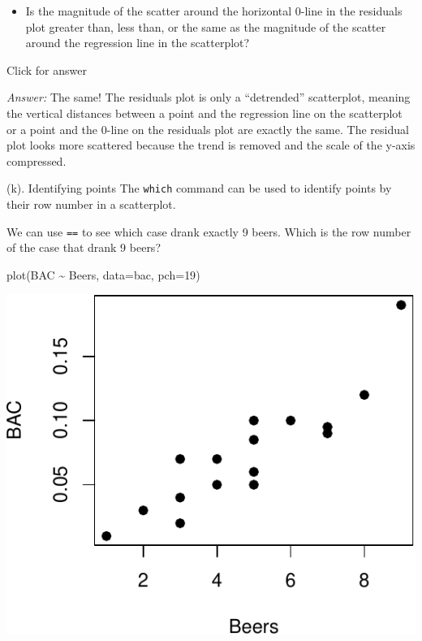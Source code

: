 \documentclass[
]{book}
\newenvironment{Shaded}{\begin{snugshade}}{\end{snugshade}}
\newcommand{\AttributeTok}[1]{\textcolor[rgb]{0.77,0.63,0.00}{#1}}
\newcommand{\DecValTok}[1]{\textcolor[rgb]{0.00,0.00,0.81}{#1}}
\newcommand{\FunctionTok}[1]{\textcolor[rgb]{0.00,0.00,0.00}{#1}}
\newcommand{\NormalTok}[1]{#1}
\newcommand{\SpecialCharTok}[1]{\textcolor[rgb]{0.00,0.00,0.00}{#1}}
\providecommand{\tightlist}{%
  \setlength{\itemsep}{0pt}\setlength{\parskip}{0pt}}
\begin{document}
\begin{itemize}
\tightlist
\item
  Is the magnitude of the scatter around the horizontal 0-line in the residuals plot greater than, less than, or the same as the magnitude of the scatter around the regression line in the scatterplot?
\end{itemize}

Click for answer

\emph{Answer:} The same! The residuals plot is only a ``detrended'' scatterplot, meaning the vertical distances between a point and the regression line on the scatterplot or a point and the 0-line on the residuals plot are exactly the same. The residual plot looks more scattered because the trend is removed and the scale of the y-axis compressed.

(k). Identifying points
The \texttt{which} command can be used to identify points by their row number in a scatterplot.

We can use \texttt{==} to see which case drank exactly 9 beers. Which is the row number of the case that drank 9 beers?

\begin{Shaded}
\begin{Highlighting}[]
\FunctionTok{plot}\NormalTok{(BAC }\SpecialCharTok{\textasciitilde{}}\NormalTok{ Beers, }\AttributeTok{data=}\NormalTok{bac, }\AttributeTok{pch=}\DecValTok{19}\NormalTok{)  }
\end{Highlighting}
\end{Shaded}

\includegraphics[width=1\linewidth]{Class_Activity_6_files/figure-latex/unnamed-chunk-13-1}
\end{document}
